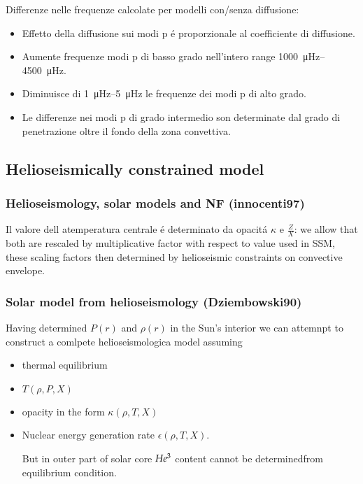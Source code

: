 \documentclass[../main.tex]{subfiles}
\begin{document}
Differenze nelle frequenze calcolate per modelli con/senza diffusione:
\begin{itemize}
    \item Effetto della diffusione sui modi p \'e proporzionale al coefficiente di diffusione.
    \item Aumente frequenze modi p di basso grado nell'intero range \SIrange{1000}{4500}{\micro\hertz}.
    \item Diminuisce di \SIrange{1}{5}{\micro\hertz} le frequenze dei modi p di alto grado.
    \item Le differenze nei modi p di grado intermedio son determinate dal grado di penetrazione oltre il fondo della zona convettiva.
\end{itemize}

\clearpage

\subsection{Helioseismically constrained model}

\subsubsection{Helioseismology, solar models and NF (innocenti97)}

Il valore dell atemperatura centrale \'e determinato da opacit\'a $\kappa$ e $\frac{Z}{X}$: we allow that both are rescaled by multiplicative factor with respect to value used in SSM, these scaling factors then determined by helioseismic constraints on convective envelope.

\subsubsection{Solar model from helioseismology (Dziembowski90)}

Having determined $P(r)$ and $\rho(r)$ in the Sun's interior we can attemnpt to construct a comlpete helioseismologica model assuming

\begin{itemize}
    \item thermal equilibrium
    \item $T(\rho,P,X)$
    \item opacity in the form $\kappa(\rho,T,X)$
    \item Nuclear energy generation rate $\epsilon(\rho,T,X)$.
    
    But in outer part of solar core $He\indices{^3}$ content cannot be determinedfrom equilibrium condition.
\end{itemize}
\end{document}
